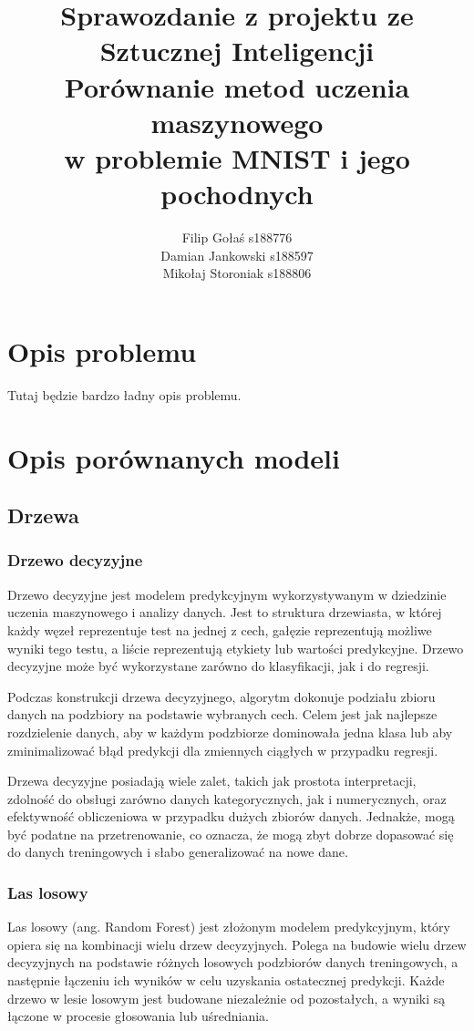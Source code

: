 \documentclass{article}
\title{Sprawozdanie z projektu ze Sztucznej Inteligencji \\ 
Porównanie metod uczenia maszynowego \\ 
w problemie MNIST i jego pochodnych}
\author{Filip Gołaś s188776 \\ Damian Jankowski s188597 \\ Mikołaj Storoniak s188806}
\begin{document}
\maketitle

\tableofcontents

\section{Opis problemu}

Tutaj będzie bardzo ładny opis problemu.

\section{Opis porównanych modeli}

\subsection{Drzewa}
\subsubsection{Drzewo decyzyjne}
Drzewo decyzyjne jest modelem predykcyjnym wykorzystywanym w 
dziedzinie uczenia maszynowego i analizy danych. Jest to 
struktura drzewiasta, w której każdy węzeł reprezentuje 
test na jednej z cech, gałęzie reprezentują możliwe wyniki 
tego testu, a liście reprezentują etykiety lub wartości 
predykcyjne. Drzewo decyzyjne może być wykorzystane 
zarówno do klasyfikacji, jak i do regresji.

Podczas konstrukcji drzewa decyzyjnego, 
algorytm dokonuje podziału zbioru danych 
na podzbiory na podstawie wybranych cech. 
Celem jest jak najlepsze rozdzielenie danych, 
aby w każdym podzbiorze dominowała jedna klasa 
lub aby zminimalizować błąd predykcji dla zmiennych 
ciągłych w przypadku regresji.

Drzewa decyzyjne posiadają wiele zalet, takich jak 
prostota interpretacji, zdolność do obsługi zarówno 
danych kategorycznych, jak i numerycznych, oraz efektywność 
obliczeniowa w przypadku dużych zbiorów danych. Jednakże, 
mogą być podatne na przetrenowanie, co oznacza, że mogą zbyt 
dobrze dopasować się do danych treningowych i słabo generalizować na nowe dane.

\subsubsection{Las losowy}
Las losowy (ang. Random Forest) jest złożonym modelem 
predykcyjnym, który opiera się na kombinacji wielu drzew decyzyjnych. 
Polega na budowie wielu drzew decyzyjnych na podstawie 
różnych losowych podzbiorów danych treningowych, a 
następnie łączeniu ich wyników w celu uzyskania ostatecznej 
predykcji. Każde drzewo w lesie losowym jest budowane 
niezależnie od pozostałych, a wyniki są łączone w procesie 
głosowania lub uśredniania.
\end{document}
